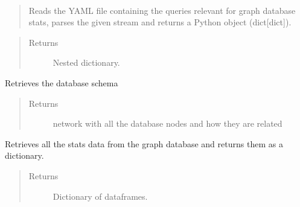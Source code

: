 \documentclass[letterpaper,10pt,english]{sphinxmanual}
\begin{document}
\begin{fulllineitems}
\label{\detokenize{_autosummary/report_manager.apps:report_manager.apps.homepageStats.get_query}}~\begin{quote}

Reads the YAML file containing the queries relevant for graph database stats, parses the given stream and        returns a Python object (dict{[}dict{]}).
\end{quote}
\begin{quote}\begin{description}
\item[{Returns}] \leavevmode
Nested dictionary.

\end{description}\end{quote}

\end{fulllineitems}


\begin{fulllineitems}
\label{\detokenize{_autosummary/report_manager.apps:report_manager.apps.homepageStats.get_db_schema}}
Retrieves the database schema
\begin{quote}\begin{description}
\item[{Returns}] \leavevmode
network with all the database nodes and how they are related

\end{description}\end{quote}

\end{fulllineitems}


\begin{fulllineitems}
\label{\detokenize{_autosummary/report_manager.apps:report_manager.apps.homepageStats.get_db_stats_data}}
Retrieves all the stats data from the graph database and returns them as a dictionary.
\begin{quote}\begin{description}
\item[{Returns}] \leavevmode
Dictionary of dataframes.

\end{description}\end{quote}

\end{fulllineitems}
\end{document}
